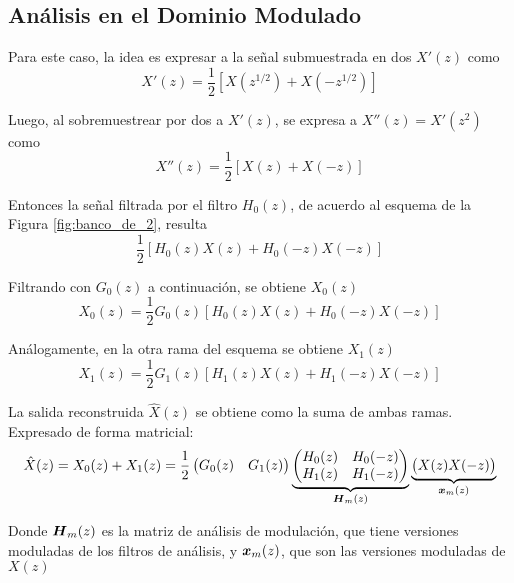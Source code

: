 \subsection{Análisis en el Dominio Modulado}

	Para este caso, la idea es expresar a la señal submuestrada en dos $X'(z)$ como
		\begin{equation}
			X'(z)=\frac{1}{2}[X(z^{1/2})+X(-z^{1/2})]
		\end{equation}

	Luego, al sobremuestrear por dos a $X'(z)$, se expresa a $X''(z)=X'(z^2)$ como
		\begin{equation}
			X''(z)=\frac{1}{2}[X(z)+X(-z)]
		\end{equation}

	Entonces la señal filtrada por el filtro $H_0(z)$, de acuerdo al esquema de la Figura \ref{fig:banco_de_2}, resulta
		\begin{equation}
			\frac{1}{2}[H_0(z)X(z)+H_0(-z)X(-z)]
		\end{equation}

	Filtrando con $G_0(z)$ a continuación, se obtiene $X_0(z)$
		\begin{equation}
			X_0(z)=\frac{1}{2}G_0(z)[H_0(z)X(z)+H_0(-z)X(-z)]
		\end{equation}

	Análogamente, en la otra rama del esquema se obtiene $X_1(z)$
		\begin{equation}
			X_1(z)=\frac{1}{2}G_1(z)[H_1(z)X(z)+H_1(-z)X(-z)]
		\end{equation}

	La salida reconstruida $\hat{X}(z)$ se obtiene como la suma de ambas ramas. Expresado de forma matricial:
		\begin{equation}
			\hat{X}(z)
			=
			X_0(z)+X_1(z)
			=
			\frac{1}{2}
			\begin{pmatrix}
				G_0(z) & G_1(z)
			\end{pmatrix}
			\underbrace{
				\begin{pmatrix}
					H_0(z) & H_0(-z) \\
					H_1(z) & H_1(-z)
				\end{pmatrix}
			}_{\boldsymbol{H}_m(z)}
			\underbrace{
				\begin{pmatrix}
					X(z) X(-z)
				\end{pmatrix}
			}_{\boldsymbol{x}_m(z)}
		\label{eq:modmat}
		\end{equation}

	Donde $\boldsymbol{H}_m(z)$ es la matriz de análisis de modulación, que tiene versiones moduladas de los filtros de análisis, y $\boldsymbol{x}_m(z)$, que son las versiones moduladas de $X(z)$

